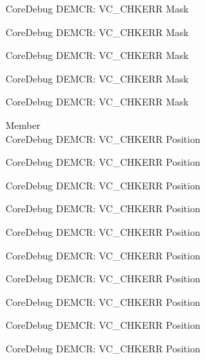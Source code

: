 \begin{DoxyRefList}
\label{deprecated__deprecated000867}%
%
Core\+Debug DEMCR\+: VC\+\_\+\+CHKERR Mask 

\label{deprecated__deprecated001009}%
%
Core\+Debug DEMCR\+: VC\+\_\+\+CHKERR Mask 

\label{deprecated__deprecated001085}%
%
Core\+Debug DEMCR\+: VC\+\_\+\+CHKERR Mask 

\label{deprecated__deprecated001174}%
%
Core\+Debug DEMCR\+: VC\+\_\+\+CHKERR Mask 

\label{deprecated__deprecated001276}%
%
Core\+Debug DEMCR\+: VC\+\_\+\+CHKERR Mask  
\item[Member \doxylink{group___c_m_s_i_s___core_debug_ga10fc7c53bca904c128bc8e1a03072d50}{Core\+Debug\+\_\+\+DEMCR\+\_\+\+VC\+\_\+\+CHKERR\+\_\+\+Pos} ]\hfill \\
\label{deprecated__deprecated000063}%
%
Core\+Debug DEMCR\+: VC\+\_\+\+CHKERR Position 

\label{deprecated__deprecated000207}%
%
Core\+Debug DEMCR\+: VC\+\_\+\+CHKERR Position 

\label{deprecated__deprecated000349}%
%
Core\+Debug DEMCR\+: VC\+\_\+\+CHKERR Position 

\label{deprecated__deprecated000425}%
%
Core\+Debug DEMCR\+: VC\+\_\+\+CHKERR Position 

\label{deprecated__deprecated000514}%
%
Core\+Debug DEMCR\+: VC\+\_\+\+CHKERR Position 

\label{deprecated__deprecated000616}%
%
Core\+Debug DEMCR\+: VC\+\_\+\+CHKERR Position 

\label{deprecated__deprecated000722}%
%
Core\+Debug DEMCR\+: VC\+\_\+\+CHKERR Position 

\label{deprecated__deprecated000866}%
%
Core\+Debug DEMCR\+: VC\+\_\+\+CHKERR Position 

\label{deprecated__deprecated001008}%
%
Core\+Debug DEMCR\+: VC\+\_\+\+CHKERR Position 

\label{deprecated__deprecated001084}%
%
Core\+Debug DEMCR\+: VC\+\_\+\+CHKERR Position 


\end{DoxyRefList}
